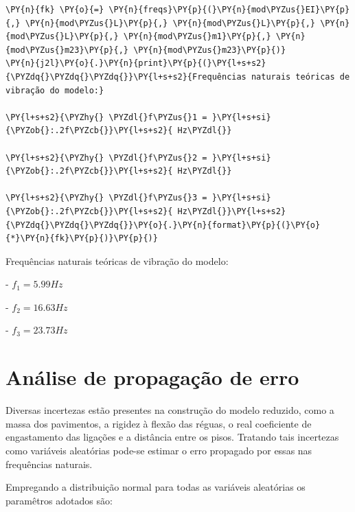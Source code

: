     \begin{tcolorbox}[breakable, size=fbox, boxrule=1pt, pad at break*=1mm,colback=cellbackground, colframe=cellborder]
\begin{Verbatim}[commandchars=\\\{\}]
\PY{n}{fk} \PY{o}{=} \PY{n}{freqs}\PY{p}{(}\PY{n}{mod\PYZus{}EI}\PY{p}{,} \PY{n}{mod\PYZus{}L}\PY{p}{,} \PY{n}{mod\PYZus{}L}\PY{p}{,} \PY{n}{mod\PYZus{}L}\PY{p}{,} \PY{n}{mod\PYZus{}m1}\PY{p}{,} \PY{n}{mod\PYZus{}m23}\PY{p}{,} \PY{n}{mod\PYZus{}m23}\PY{p}{)}
\PY{n}{j2l}\PY{o}{.}\PY{n}{print}\PY{p}{(}\PY{l+s+s2}{\PYZdq{}\PYZdq{}\PYZdq{}}\PY{l+s+s2}{Frequências naturais teóricas de vibração do modelo:}

\PY{l+s+s2}{\PYZhy{} \PYZdl{}f\PYZus{}1 = }\PY{l+s+si}{\PYZob{}:.2f\PYZcb{}}\PY{l+s+s2}{ Hz\PYZdl{}}

\PY{l+s+s2}{\PYZhy{} \PYZdl{}f\PYZus{}2 = }\PY{l+s+si}{\PYZob{}:.2f\PYZcb{}}\PY{l+s+s2}{ Hz\PYZdl{}}

\PY{l+s+s2}{\PYZhy{} \PYZdl{}f\PYZus{}3 = }\PY{l+s+si}{\PYZob{}:.2f\PYZcb{}}\PY{l+s+s2}{ Hz\PYZdl{}}\PY{l+s+s2}{\PYZdq{}\PYZdq{}\PYZdq{}}\PY{o}{.}\PY{n}{format}\PY{p}{(}\PY{o}{*}\PY{n}{fk}\PY{p}{)}\PY{p}{)}
\end{Verbatim}
\end{tcolorbox}

    Frequências naturais teóricas de vibração do modelo:

- $f_1 = 5.99 Hz$

- $f_2 = 16.63 Hz$

- $f_3 = 23.73 Hz$

    
    \hypertarget{anuxe1lise-de-propagauxe7uxe3o-de-erro}{%
\section{Análise de propagação de
erro}\label{anuxe1lise-de-propagauxe7uxe3o-de-erro}}

Diversas incertezas estão presentes na construção do modelo reduzido,
como a massa dos pavimentos, a rigidez à flexão das réguas, o real
coeficiente de engastamento das ligações e a distância entre os pisos.
Tratando tais incertezas como variáveis aleatórias pode-se estimar o
erro propagado por essas nas frequências naturais.

Empregando a distribuição normal para todas as variáveis aleatórias os
paramêtros adotados são:

